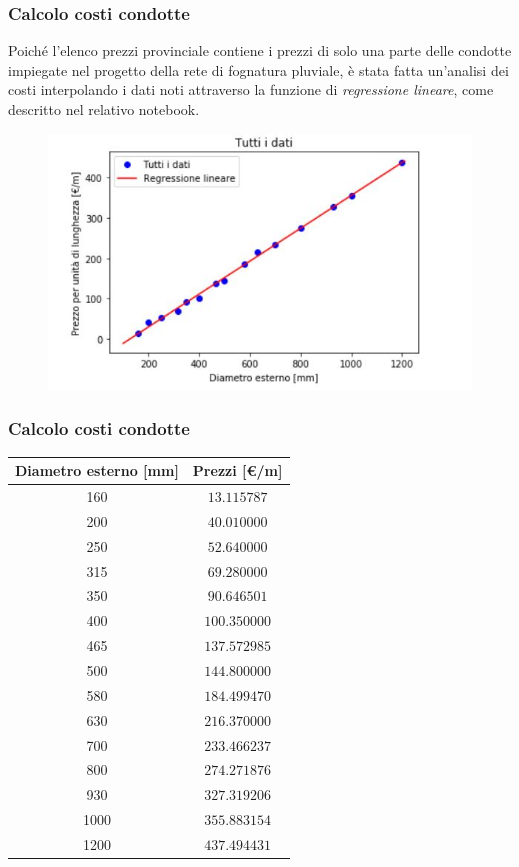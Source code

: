 \documentclass{beamer}
\begin{document}
\begin{frame}
 \frametitle{Calcolo costi condotte}
 Poiché l'elenco prezzi provinciale contiene i prezzi di solo una parte delle condotte impiegate nel progetto della rete di fognatura pluviale, è stata fatta un'analisi dei costi interpolando i dati noti attraverso la funzione di \emph{regressione lineare}, come descritto nel relativo notebook.
 \begin{figure}
  \centering
  \includegraphics[height=.6\textheight]{images/interpolazione_costi_tubi.jpg}
 \end{figure}
\end{frame}


\begin{frame}
 \frametitle{Calcolo costi condotte}
 \footnotesize
 \begin{table}
  \begin{tabular}{cc}
  \toprule
  Diametro esterno [mm]& Prezzi [\euro/m] \\
  \midrule
  160                   &     $13.115787$ \\
  200                   &     $40.010000$ \\
  250                   &     $52.640000$ \\
  315                   &     $69.280000$ \\
  350                   &     $90.646501$ \\
  400                   &    $100.350000$ \\
  465                   &    $137.572985 $\\
  500                   &    $144.800000 $\\
  580                   &    $184.499470$ \\
  630                   &    $216.370000$ \\
  700                   &    $233.466237$ \\
  800                   &    $274.271876$ \\
  930                   &   $ 327.319206 $\\
  1000                  &   $ 355.883154$ \\
  1200                  &   $ 437.494431$ \\
  \bottomrule
  \end{tabular}
 \end{table}
\end{frame}
\end{document}
